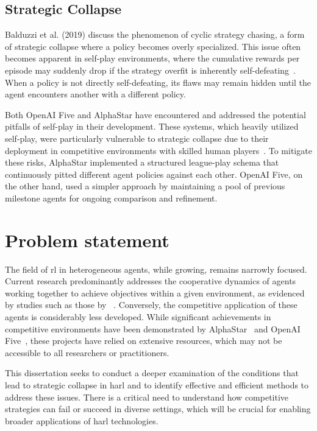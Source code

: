     \subsection*{Strategic Collapse}%

Balduzzi et al. (2019) discuss the phenomenon of cyclic strategy chasing, 
a form of strategic collapse where a policy becomes overly specialized. 
This issue often becomes apparent in self-play environments, 
where the cumulative rewards per episode may suddenly drop if the strategy overfit is 
inherently self-defeating~\cite{balduzzi2019}. 
When a policy is not directly self-defeating, its flaws may remain hidden until the 
agent encounters another with a different policy.

Both OpenAI Five and AlphaStar have encountered and addressed the potential pitfalls of 
self-play in their development. These systems, which heavily utilized self-play, 
were particularly vulnerable to strategic collapse due to their deployment in competitive 
environments with skilled human players~\cite{berner2019, vinyals2019}. 
To mitigate these risks, AlphaStar implemented a structured league-play schema that 
continuously pitted different agent policies against each other. 
OpenAI Five, on the other hand, used a simpler approach by maintaining a pool of 
previous milestone agents for ongoing comparison and refinement.


\section{Problem statement}%
\label{sec:problem_statement}

The field of \gls{rl} in heterogeneous agents, while growing, remains narrowly focused. 
Current research predominantly addresses the cooperative dynamics of agents working together to 
achieve objectives within a given environment, as evidenced by studies such as those by 
~\cite*{zhong2024, zheng2020, wakilpoor2020, kapetanakis2005}. 
Conversely, the competitive application of these agents is considerably less developed. 
While significant achievements in competitive environments have been demonstrated by 
AlphaStar~\cite{vinyals2019} and OpenAI Five~\cite{berner2019}, 
these projects have relied on extensive resources, which may not be accessible to all 
researchers or practitioners.

This dissertation seeks to conduct a deeper examination of the conditions that lead to strategic
collapse in \gls{harl} and to identify effective and efficient methods to address these issues. 
There is a critical need to understand how competitive strategies can fail or succeed in diverse 
settings, which will be crucial for enabling broader applications of \gls{harl} technologies.


